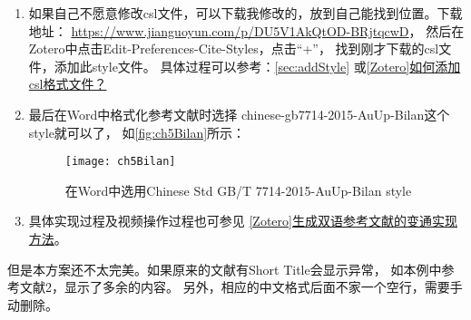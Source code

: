 \documentclass[cn,11pt,chinese]{elegantbook}
\begin{document}
\begin{enumerate}
\begin{lstlisting}
								[3] UDENIGWE C C, WU S, DRUMMOND K, 等. Revisiting the prospects of plastein: thermal and simulated gastric stability in relation to the antioxidative capacity of casein plastein[J]. Journal of Agricultural and Food Chemistry, 2014,62(1):130–135. 
								Revisiting the prospects of plastein.
								
								[4] 张娟娟, 刘尊英, 董士远, 等. 锌离子结合类蛋白反应修饰肽的稳定性研究[J]. 现代食品科技, 2015,31(09):150–154. 
								ZHANG J J,LIU J Y,DONG S Y,et al. Stability of modified peptide using zinc binding and plastein reaction [J]. Modern Food Science and Technology, 2015, 31(09): 150–154.
								
								[5] 朱磊, 张馨心, 谢艳英, 等. 类蛋白反应的作用机制及其对海洋源蛋白修饰的研究进展[J]. 食品工业科技, 2020,41(09):362–367. 
								ZHU L,ZHANG X X,XIE Y Y,et al. Research progress on mechanism of plastein reactions and its modification function of marine proteins [J]. Science and Technology of Food Industry, 2020, 41(09): 362–367.
							\end{lstlisting}
						\item 如果自己不愿意修改csl文件，可以下载我修改的，放到自己能找到位置。下载地址：
							\url{https://www.jianguoyun.com/p/DU5V1AkQtOD-BRjtqcwD}，
							然后在Zotero中点击Edit-Preferences-Cite-Styles，点击“+”，
							找到刚才下载的csl文件，添加此style文件。
							具体过程可以参考：\cref{sec:addStyle}
							或\href{https://zhuanlan.zhihu.com/p/64624484}{[Zotero]如何添加csl格式文件？}
						\item 	
							最后在Word中格式化参考文献时选择
							chinese-gb7714-2015-AuUp-Bilan这个style就可以了，
							如\autoref{fig:ch5Bilan}所示：
								\begin{figure}[ht]
									\centering
									\texttt{[image: ch5Bilan]}
									\caption{在Word中选用Chinese Std GB/T 7714-2015-AuUp-Bilan style}
									\label{fig:ch5Bilan}
								\end{figure}
	
						\item 	具体实现过程及视频操作过程也可参见
							\href{https://zhuanlan.zhihu.com/p/282826403}
							{[Zotero]生成双语参考文献的变通实现方法}。
				\end{enumerate}

				 
				但是本方案还不太完美。如果原来的文献有Short Title会显示异常，
				如本例中参考文献2，显示了多余的内容。
				另外，相应的中文格式后面不家一个空行，需要手动删除。
\end{document}
